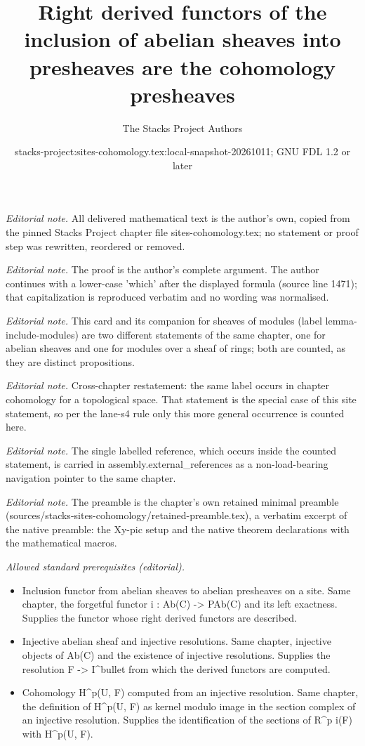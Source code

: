\documentclass[10pt,a4paper]{amsart}
\title{Right derived functors of the inclusion of abelian sheaves into presheaves are the cohomology presheaves}
\author{The Stacks Project Authors}
\date{stacks-project:sites-cohomology.tex:local-snapshot-20261011; GNU FDL 1.2 or later}
\theoremstyle{plain}
\theoremstyle{definition}
\theoremstyle{remark}
\numberwithin{equation}{subsection}
\begin{document}
\maketitle
\noindent\textit{Editorial note.} All delivered mathematical text is the author's own, copied from the pinned Stacks Project chapter file sites-cohomology.tex; no statement or proof step was rewritten, reordered or removed.\par\medskip
\noindent\textit{Editorial note.} The proof is the author's complete argument. The author continues with a lower-case 'which' after the displayed formula (source line 1471); that capitalization is reproduced verbatim and no wording was normalised.\par\medskip
\noindent\textit{Editorial note.} This card and its companion for sheaves of modules (label lemma-include-modules) are two different statements of the same chapter, one for abelian sheaves and one for modules over a sheaf of rings; both are counted, as they are distinct propositions.\par\medskip
\noindent\textit{Editorial note.} Cross-chapter restatement: the same label occurs in chapter cohomology for a topological space. That statement is the special case of this site statement, so per the lane-s4 rule only this more general occurrence is counted here.\par\medskip
\noindent\textit{Editorial note.} The single labelled reference, which occurs inside the counted statement, is carried in assembly.external\_references as a non-load-bearing navigation pointer to the same chapter.\par\medskip
\noindent\textit{Editorial note.} The preamble is the chapter's own retained minimal preamble (sources/stacks-sites-cohomology/retained-preamble.tex), a verbatim excerpt of the native preamble: the Xy-pic setup and the native theorem declarations with the mathematical macros.\par\medskip
\noindent\textit{Allowed standard prerequisites (editorial).}\begin{itemize}
\item Inclusion functor from abelian sheaves to abelian presheaves on a site. Same chapter, the forgetful functor i : Ab(C) -> PAb(C) and its left exactness. Supplies the functor whose right derived functors are described.
\item Injective abelian sheaf and injective resolutions. Same chapter, injective objects of Ab(C) and the existence of injective resolutions. Supplies the resolution F -> I\textasciicircum{}bullet from which the derived functors are computed.
\item Cohomology H\textasciicircum{}p(U, F) computed from an injective resolution. Same chapter, the definition of H\textasciicircum{}p(U, F) as kernel modulo image in the section complex of an injective resolution. Supplies the identification of the sections of R\textasciicircum{}p i(F) with H\textasciicircum{}p(U, F).
\end{itemize}\medskip
\end{document}
